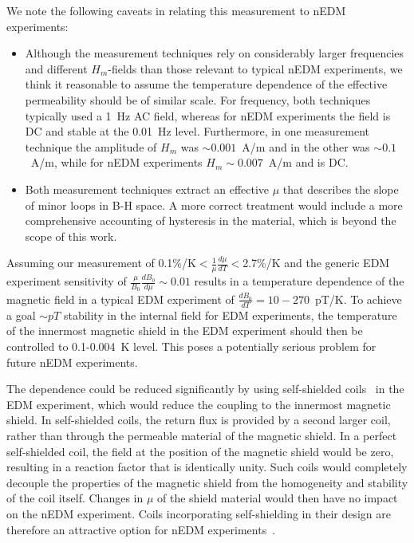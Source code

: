 \documentclass[review]{elsarticle}
\begin{document}
We note the following caveats in relating this measurement to nEDM
experiments:
\begin{itemize}
\item Although the measurement techniques rely on considerably larger
  frequencies and different $H_m$-fields than those relevant to
  typical nEDM experiments, we think it reasonable to assume the
  temperature dependence of the effective permeability should be of
  similar scale.  For frequency, both techniques typically used a 1~Hz
  AC field, whereas for nEDM experiments the field is DC and stable at
  the 0.01~Hz level.  Furthermore, in one measurement technique the
  amplitude of $H_m$ was $\sim 0.001$~A/m and in the other was $\sim
  0.1$~A/m, while for nEDM experiments $H_m\sim 0.007$~A/m and is DC.
\item Both measurement techniques extract an effective $\mu$ that
  describes the slope of minor loops in B-H space.  A more correct
  treatment would include a more comprehensive accounting of
  hysteresis in the material, which is beyond the scope of this work.
\end{itemize}

Assuming our measurement of
0.1\%/K$<\frac{1}{\mu}\frac{d\mu}{dT}<$2.7\%/K and the generic EDM
experiment sensitivity of $\frac{\mu}{B_0}\frac{dB_0}{d\mu}\sim 0.01$
results in a temperature dependence of the magnetic field in a typical
EDM experiment of $\frac{dB_0}{dT}=10-270$~pT/K.  To achieve a goal
$\sim pT$ stability in the internal field for EDM experiments, the
temperature of the innermost magnetic shield in the EDM experiment
should then be controlled to 0.1-0.004~K level.  This poses a
potentially serious problem for future nEDM experiments.

The dependence could be reduced significantly by using self-shielded
coils~\cite{bib:cpviolwithoutstrangeness,bib:someotherselfshieldedcoilpapers}
in the EDM experiment, which would reduce the coupling to the
innermost magnetic shield.  In self-shielded coils, the return flux is
provided by a second larger coil, rather than through the permeable
material of the magnetic shield.  In a perfect self-shielded coil, the
field at the position of the magnetic shield would be zero, resulting
in a reaction factor that is identically unity.  Such coils would
completely decouple the properties of the magnetic shield from the
homogeneity and stability of the coil itself.  Changes in $\mu$ of the
shield material would then have no impact on the nEDM experiment.
Coils incorporating self-shielding in their design are therefore an
attractive option for nEDM
experiments~\cite{bib:cpviolwithoutstrangeness}.
\end{document}
